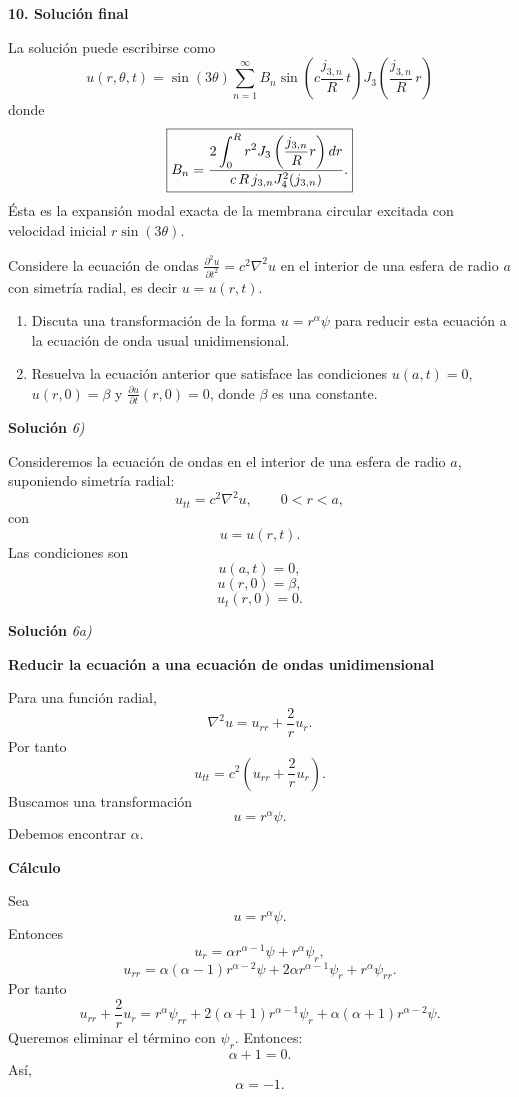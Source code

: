 \documentclass[11pt,spanish]{article}
\newcounter{problema}
\newcommand{\prob}{\stepcounter{problema} \vspace{.5cm} \noindent{\bf Problema \arabic{problema}: }}
\begin{document}
{\bf 10. Solución final}

La solución puede escribirse como
$$
\boxed{
u(r,\theta,t)
=
\sin(3\theta)
\sum_{n=1}^{\infty}
B_n
\sin\left(
c\frac{j_{3,n}}R\,t
\right)
J_3\left(
\frac{j_{3,n}}R\,r
\right)
}
$$
donde
$$
\boxed{
B_n
=
\frac{
2
\displaystyle
\int_0^R
r^2
J_3\left(\frac{j_{3,n}}Rr\right)
dr
}
{
c\,R\,j_{3,n}
J_4^2(j_{3,n})
}.
}
$$
Ésta es la expansión modal exacta de la membrana circular excitada con velocidad inicial $r\sin(3\theta)$.




\prob Considere la ecuación de ondas \(\frac{\partial^2 u}{\partial t^2}=c^2\nabla^2 u\) en el interior de una esfera de radio \(a\) con simetría radial, es decir \(u=u(r,t)\). 
\begin{enumerate}
\item Discuta una transformación de la forma \(u=r^{\alpha}\psi\) para reducir esta ecuación a la ecuación de onda usual unidimensional.
\item Resuelva la ecuación anterior que satisface las condiciones \(u(a,t)=0\), \(u(r,0)=\beta\) y \(\frac{\partial u}{\partial t}(r,0)=0\), donde \(\beta\) es una constante.
\end{enumerate}

\vspace{0.5cm}
{\bf Soluci\'on }{\em 6)}
\vspace{0.5cm}

Consideremos la ecuación de ondas en el interior de una esfera de radio $a$, suponiendo simetría radial:
$$
u_{tt}=c^2\nabla^2u,
\qquad
0<r<a,
$$
con
$$
u=u(r,t).
$$
Las condiciones son
$$
u(a,t)=0,
$$
$$
u(r,0)=\beta,
$$
$$
u_t(r,0)=0.
$$

\vspace{0.5cm}
{\bf Soluci\'on }{\em 6a)}
\vspace{0.5cm}

{\bf Reducir la ecuación a una ecuación de ondas unidimensional}

Para una función radial,
$$
\nabla^2u
=
u_{rr}
+
\frac{2}{r}u_r.
$$
Por tanto
$$
u_{tt}
=
c^2
\left(
u_{rr}
+\frac2r u_r
\right).
$$
Buscamos una transformación
$$
u=r^\alpha\psi.
$$
Debemos encontrar $\alpha$.

{\bf Cálculo}

Sea
$$
u=r^\alpha\psi.
$$
Entonces
$$
u_r
=
\alpha r^{\alpha-1}\psi
+
r^\alpha\psi_r,
$$
$$
u_{rr}
=
\alpha(\alpha-1)r^{\alpha-2}\psi
+
2\alpha r^{\alpha-1}\psi_r
+
r^\alpha\psi_{rr}.
$$
Por tanto
$$
u_{rr}+\frac2r u_r
=
r^\alpha\psi_{rr}
+
2(\alpha+1)r^{\alpha-1}\psi_r
+
\alpha(\alpha+1)r^{\alpha-2}\psi.
$$
Queremos eliminar el término con $\psi_r$.
Entonces:
$$
\alpha+1=0.
$$
Así,
$$
\boxed{\alpha=-1}.
$$
\end{document}
